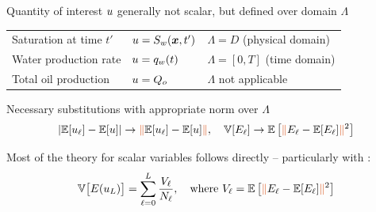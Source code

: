 \begin{frame}{\name{}}
    \begin{overlayarea}{\textwidth}{\frameheight}
        \vspace{1em}
        \begin{squarelist}
            \item<1-> Quantity of interest $u$ generally not scalar, but defined over domain $\Lambda$
            \begin{center}
                \small%
                \begin{tabular}{l|l|l}
                    Saturation at time $t'$ & $u = S_w(\bm{x}, t')$ & $\Lambda = D$ (physical domain)\\
                    Water production rate & $u = q_w(t)$ & $\Lambda = [0,T]$ (time domain) \\
                    Total oil production & $u = Q_o$ & $\Lambda$ not applicable
                \end{tabular}
            \end{center}
            \vspace{0.5em}
            \item<2-> Necessary substitutions with appropriate norm \redtext{$\|\cdot\|$} over $\Lambda$
            \begin{equation*}
                |\expect[\un_\ell] - \expect[\un]| \rightarrow \redtext{\|}\expect[\un_\ell] - \expect[\un]\redtext{\|}, \quad \var[\expecta_\ell] \rightarrow \expect\left[\redtext{\|}\expecta_\ell - \expect[\expecta_\ell]\redtext{\|}^2\right]
            \end{equation*}
            \item<3-> Most of the theory for scalar variables follows directly -- particularly with :
            \begin{equation*}
                \var\big[\expecta(\un_\nlev)\big] = \sum_{\ell = 0}^\nlev \frac{\vara_\ell}{\nsamp_\ell}, \quad \text{where } \vara_\ell = \expect\left[\redtext{\|}\expecta_\ell - \expect[\expecta_\ell]\redtext{\|}^2\right]
            \end{equation*}
        \end{squarelist}
    \end{overlayarea}
\end{frame}

